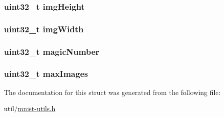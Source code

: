 \subsubsection[{img\+Height}]{\setlength{\rightskip}{0pt plus 5cm}uint32\+\_\+t img\+Height}\label{struct_m_n_i_s_t___image_file_header_a6a09bb02ac87933a7f89ac538e93f167}
\hypertarget{struct_m_n_i_s_t___image_file_header_a68149ebeec0e98d84f4ba36ccd8c7950}{}
\subsubsection[{img\+Width}]{\setlength{\rightskip}{0pt plus 5cm}uint32\+\_\+t img\+Width}\label{struct_m_n_i_s_t___image_file_header_a68149ebeec0e98d84f4ba36ccd8c7950}
\hypertarget{struct_m_n_i_s_t___image_file_header_a3081fb3d81f6a8484b9451a66e4d1dba}{}
\subsubsection[{magic\+Number}]{\setlength{\rightskip}{0pt plus 5cm}uint32\+\_\+t magic\+Number}\label{struct_m_n_i_s_t___image_file_header_a3081fb3d81f6a8484b9451a66e4d1dba}
\hypertarget{struct_m_n_i_s_t___image_file_header_a0c2553aeb6074229351ddfd76c613831}{}
\subsubsection[{max\+Images}]{\setlength{\rightskip}{0pt plus 5cm}uint32\+\_\+t max\+Images}\label{struct_m_n_i_s_t___image_file_header_a0c2553aeb6074229351ddfd76c613831}


The documentation for this struct was generated from the following file\+:\begin{DoxyCompactItemize}
\item 
util/\hyperlink{mnist-utils_8h}{mnist-\/utils.\+h}\end{DoxyCompactItemize}
